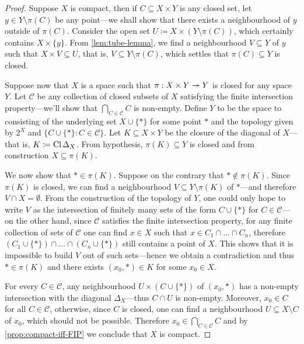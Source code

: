 \begin{proof}
Suppose \(X\) is compact, then if \(C \subseteq X \times Y\) is any closed set,
let \(y \in Y \setminus \pi(C)\) be any point---we shall show that there
exists a neighbourhood of \(y\) outside of \(\pi(C)\). Consider the open set
\(U \coloneq X \times (Y \setminus \pi(C))\), which certainly contains
\(X \times \{y\}\). From \cref{lem:tube-lemma}, we find a neighbourhood
\(V \subseteq Y\) of \(y\) such that \(X \times V \subseteq U\), that is,
\(V \subseteq Y \setminus \pi(C)\), which settles that \(\pi(C) \subseteq Y\) is
closed.

Suppose now that \(X\) is a space such that \(\pi: X \times Y \twoheadrightarrow Y\) is closed
for any space \(Y\). Let \(\mathcal{C}\) be any collection of closed subsets of
\(X\) satisfying the finite intersection property---we'll show that
\(\bigcap_{C \in \mathcal{C}} C\) is non-empty. Define \(Y\) to be the space to
consisting of the underlying set \(X \cup \{*\}\) for some point \(*\) and the
topology given by \(2^X\) and \(\{C \cup \{*\} \colon C \in \mathcal{C}\}\). Let
\(K \subseteq X \times Y\) be the closure of the diagonal of \(X\)---that is,
\(K \coloneq \operatorname{Cl} \Delta_X\). From hypothesis, \(\pi(K) \subseteq Y\) is
closed and from construction \(X \subseteq \pi(K)\).

We now show that \(* \in \pi(K)\). Suppose on the contrary that
\(* \notin \pi(K)\). Since \(\pi(K)\) is closed, we can find a neighbourhood
\(V \subseteq Y \setminus \pi(K)\) of \(*\)---and therefore
\(V \cap X = \emptyset\). From the construction of the topology of \(Y\), one
could only hope to write \(V\) as the intersection of finitely many sets of the
form \(C \cup \{*\}\) for \(C \in \mathcal{C}\)---on the other hand, since
\(\mathcal{C}\) satisfies the finite intersection property, for any finite
collection of sets of \(\mathcal{C}\) one can find \(x \in X\) such that
\(x \in C_1 \cap \dots \cap C_n\), therefore
\((C_1 \cup \{*\}) \cap \dots \cap (C_n \cup \{*\})\) still contains a point of
\(X\). This shows that it is impossible to build \(V\) out of such sets---hence
we obtain a contradiction and thus \(* \in \pi(K)\) and there exists
\((x_0, *) \in K\) for some \(x_0 \in X\).

For every \(C \in \mathcal{C}\), any neighbourhood \(U \times (C \cup \{*\})\)
of \((x_0, *)\) has a non-empty intersection with the diagonal
\(\Delta_X\)---thus \(C \cap U\) is non-empty. Moreover, \(x_0 \in C\) for all
\(C \in \mathcal{C}\), otherwise, since \(C\) is closed, one can find a
neighbourhood \(U \subseteq X \setminus C\) of \(x_0\), which should not be
possible. Therefore \(x_0 \in \bigcap_{C \in \mathcal{C}} C\) and by
\cref{prop:compact-iff-FIP} we conclude that \(X\) is compact.
\end{proof}

